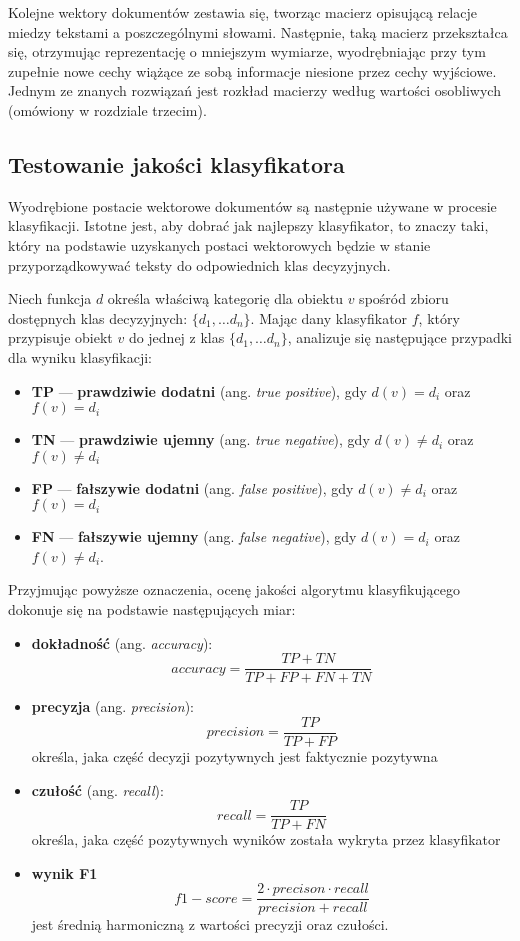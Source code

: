 \documentclass{pracamgr}
\begin{document}
Kolejne wektory dokumentów zestawia się, tworząc macierz opisującą relacje miedzy tekstami a poszczególnymi słowami. Następnie, taką macierz przekształca się, otrzymując reprezentację o mniejszym wymiarze, wyodrębniając przy tym zupełnie nowe cechy wiążące ze sobą informacje niesione przez cechy wyjściowe. Jednym ze znanych rozwiązań jest rozkład macierzy według wartości osobliwych (omówiony w rozdziale trzecim).

\subsection{Testowanie jakości klasyfikatora}

Wyodrębione postacie wektorowe dokumentów są następnie używane w procesie klasyfikacji. Istotne jest, aby dobrać jak najlepszy klasyfikator, to znaczy taki, który na podstawie uzyskanych postaci wektorowych będzie w stanie przyporządkowywać teksty do odpowiednich klas decyzyjnych. 

Niech funkcja $d$ określa właściwą kategorię dla obiektu $v$ spośród zbioru dostępnych klas decyzyjnych: $\{ d_1, \ldots d_n \}$.  Mając dany klasyfikator $f$, który przypisuje obiekt $v$ do jednej z klas $\{ d_1, \ldots d_n \}$, analizuje się następujące przypadki dla wyniku klasyfikacji:

\begin{itemize}
    \item \textbf{TP} --- \textbf{prawdziwie dodatni} (ang. \textit{true positive}), gdy $d(v) = d_i$ oraz $f(v) = d_i$
    \item \textbf{TN} --- \textbf{prawdziwie ujemny} (ang. \textit{true negative}), gdy $d(v) \neq d_i$ oraz $f(v) \neq d_i$
    \item \textbf{FP} --- \textbf{fałszywie dodatni} (ang. \textit{false positive}), gdy $d(v) \neq d_i$ oraz $f(v) = d_i$
    \item \textbf{FN} --- \textbf{fałszywie ujemny} (ang. \textit{false negative}), gdy $d(v) = d_i$ oraz $f(v) \neq d_i$.
\end{itemize}

Przyjmując powyższe oznaczenia, ocenę jakości algorytmu klasyfikującego dokonuje się na podstawie następujących miar:

\begin{itemize}
    \item \textbf{dokładność} (ang. \textit{accuracy}):
        \[
            accuracy = \frac{TP + TN}{TP + FP + FN + TN}
        \]
    \item \textbf{precyzja} (ang. \textit{precision}):
        \[
            precision = \frac{TP}{TP + FP}
        \]
        określa, jaka część decyzji pozytywnych jest faktycznie pozytywna 
    \item \textbf{czułość} (ang. \textit{recall}):
        \[
            recall = \frac{TP}{TP + FN}
        \]
        określa, jaka część pozytywnych wyników została wykryta przez klasyfikator
    \item \textbf{wynik F1}
        \[
            f1-score = \frac{2 \cdot precison \cdot recall}{precision + recall} 
        \]
        jest średnią harmoniczną z wartości precyzji oraz czułości.
\end{itemize}
\end{document}
